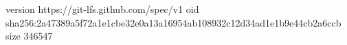 version https://git-lfs.github.com/spec/v1
oid sha256:2a47389a5f72a1e1cbe32e0a13a16954ab108932c12d34ad1e1b9e44cb2a6ccb
size 346547
